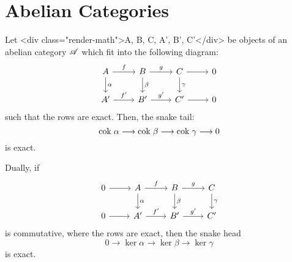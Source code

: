 \section{Abelian Categories}

\begin{prop}
Let <div class="render-math">A, B, C, A', B', C'</div> be objects of an abelian category 
$\mathscr{A}$ which fit into the following diagram:
\[
\begin{tikzcd}
A \arrow{r}{f} \arrow{d}{\alpha} &
B \arrow{r}{g} \arrow{d}{\beta} &
C \arrow{r} \arrow{d}{\gamma} &
0 \\
A' \arrow{r}{f'} &
B' \arrow{r}{g'} &
C' \arrow{r} &
0
\end{tikzcd}
\]
such that the rows are exact. Then, the snake tail:
\[
\mathrm{cok}\; \alpha \longrightarrow \mathrm{cok}\; \beta \longrightarrow \mathrm{cok}\; \gamma \longrightarrow 0
\] 
is exact.

Dually, if
\[
\begin{tikzcd}
0 \arrow{r}&
A \arrow{r}{f} \arrow{d}{\alpha} &
B \arrow{r}{g} \arrow{d}{\beta} &
C \arrow{d}{\gamma} \\
0 \arrow{r}&
A' \arrow{r}{f'} &
B' \arrow{r}{g'} &
C' 
\end{tikzcd}
\]
is commutative, where the rows are exact, then the snake
head
\[
0 \to \ker \alpha \to \ker \beta \to \ker \gamma
\]
is exact.
\end{prop}

